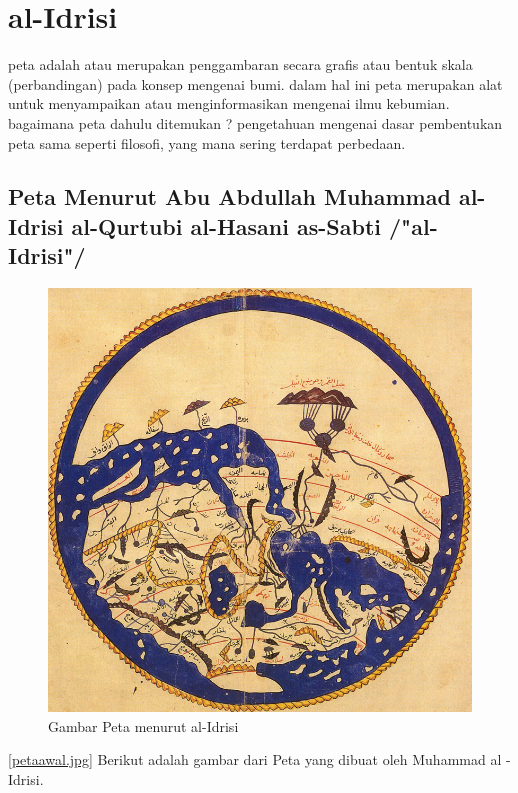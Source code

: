 
\section{al-Idrisi}
	peta adalah atau merupakan penggambaran secara grafis atau bentuk skala (perbandingan) pada konsep mengenai bumi. dalam hal ini peta merupakan alat untuk menyampaikan atau menginformasikan mengenai ilmu kebumian. bagaimana peta dahulu ditemukan ? pengetahuan mengenai dasar pembentukan peta sama seperti filosofi, yang mana sering terdapat perbedaan.

\subsection{Peta Menurut Abu Abdullah Muhammad al-Idrisi al-Qurtubi al-Hasani as-Sabti /"al-Idrisi"/}
	\begin{figure} [ht]
	\centerline{\includegraphics[width=1\textwidth]{figures/petaawal.jpg}}
	\caption{Gambar Peta menurut al-Idrisi}
	\label{Petaal-Idrisi}
	\end{figure}
	\ref{petaawal.jpg} Berikut adalah gambar dari Peta yang dibuat oleh Muhammad al - Idrisi.
